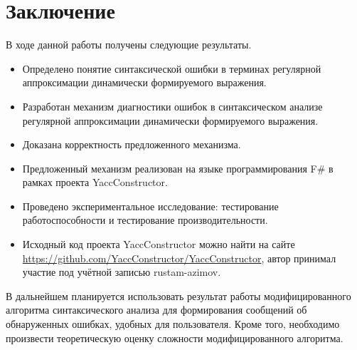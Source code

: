 \section{Заключение}
В ходе данной работы получены следующие результаты.
\begin{itemize}
    \item{Определено понятие синтаксической ошибки в терминах регулярной аппроксимации динамически формируемого выражения.}
    \item{Разработан механизм диагностики ошибок в синтаксическом анализе регулярной аппроксимации динамически формируемого выражения.}
    \item{Доказана корректность предложенного механизма.}
    \item{Предложенный механизм реализован на языке программирования F\# в рамках проекта YaccConstructor.}
    \item{Проведено экспериментальное исследование: тестирование работоспособности и тестирование производительности.}
    \item{Исходный код проекта YaccConstructor можно найти на сайте \url{https://github.com/YaccConstructor/YaccConstructor}, автор принимал участие под учётной записью rustam-azimov.}
\end{itemize}

В дальнейшем планируется использовать результат работы модифицированного алгоритма синтаксического анализа для формирования сообщений об обнаруженных ошибках, удобных для пользователя. Кроме того, необходимо произвести теоретическую оценку сложности модифицированного алгоритма.